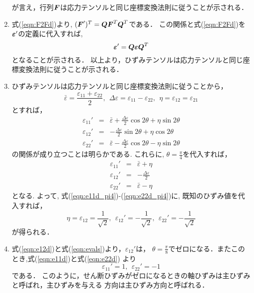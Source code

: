 \documentclass[10pt,a4j]{jarticle}
\begin{document}
\begin{enumerate}
	が言え，行列$\mbox{\boldmath $F$}$は応力テンソルと同じ座標変換法則に従うことが示される．
\item
	式(\ref{eqn:F2Fd})より, $(\mbox{\boldmath $F$}')^T=\mbox{\boldmath $Q$}\mbox{\boldmath $F$}^T\mbox{\boldmath $Q$}^T$である．
	この関係と式(\ref{eqn:F2Fd})を$\mbox{\boldmath $\varepsilon$}'$の定義に代入すれば, 
	\begin{equation}
		\mbox{\boldmath $\varepsilon$}'=\mbox{\boldmath $Q$}\mbox{\boldmath $\varepsilon$}\mbox{\boldmath $Q$}^T
	\end{equation}
	となることが示される．
	以上より，ひずみテンソルは応力テンソルと同じ座標変換法則に従うことが示される．
\item
	ひずみテンソルは応力テンソルと同じ座標変換法則に従うことから，
	\begin{equation}
		\bar \varepsilon = \frac{\varepsilon_{11}+ \varepsilon_{22}}{2} , \ \ 
		\Delta  \varepsilon = \varepsilon_{11}- \varepsilon_{22}, \ \ 
		\eta = \varepsilon_{12}=\varepsilon_{21}
	\end{equation}
	とすれば，
	\begin{eqnarray}
		\varepsilon_{11}' &=& 
			\bar \varepsilon + \frac{\Delta \varepsilon}{2} \cos 2\theta + \eta \sin 2\theta 
			\label{eqn:e11d}
			\\
		\varepsilon_{12}' &=& 
			-\frac{\Delta \varepsilon}{2} \sin 2\theta + \eta \cos 2\theta 
			\label{eqn:e12d}
			\\
		\varepsilon_{22}' &=& 
			\bar \varepsilon - \frac{\Delta \varepsilon}{2} \cos 2\theta - \eta \sin 2\theta 
			\label{eqn:e22d}
	\end{eqnarray}
	の関係が成り立つことは明らかである.
	これらに, $\theta=\frac{\pi}{4}$を代入すれば，
	\begin{eqnarray}
		\varepsilon_{11}' &=& 
			\bar \varepsilon + \eta \label{eqn:e11d_pi4}\\
		\varepsilon_{12}' &=& 
			-\frac{\Delta \varepsilon}{2} \label{eqn:e12d_pi4}\\
		\varepsilon_{22}' &=& 
			\bar \varepsilon - \eta  \label{eqn:e22d_pi4}
	\end{eqnarray}
	となる. よって, 式(\ref{eqn:e11d_pi4})-(\ref{eqn:e22d_pi4})に, 
	既知のひずみ値を代入すれば，
	\begin{equation}
		\eta=\varepsilon_{12}=\frac{1}{\sqrt{2}}, \ \ 
		\varepsilon_{12}'=-\frac{1}{\sqrt{2}}, \ \ 
		\varepsilon_{22}'=-\frac{1}{\sqrt{2}}
		\label{eqn:evals}
	\end{equation}
	が得られる．
\item
	式(\ref{eqn:e12d})と式(\ref{eqn:evals})より，$\varepsilon_{12}'$は，
	$\theta=\frac{\pi}{8}$でゼロになる．またこのとき,式(\ref{eqn:e11d})と式(\ref{eqn:e22d})
	より
	\begin{equation}
		\varepsilon_{11}'=1,　\ \ 	\varepsilon_{22}'=-1
	\end{equation}
	である．
	このように，せん断ひずみがゼロになるときの軸ひずみは主ひずみと呼ばれ，主ひずみを与える
	方向は主ひずみ方向と呼ばれる．
\end{enumerate}
\end{document}
